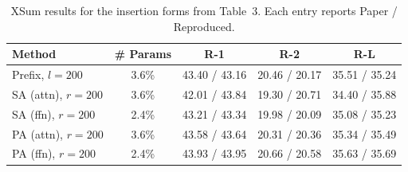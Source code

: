 \begin{table}[t]
\centering
\small
\setlength{\tabcolsep}{3.5pt}
\caption{XSum results for the insertion forms from Table~3. Each entry reports Paper / Reproduced.}
\label{tab:table3_xsum}
\begin{tabular}{@{}lcccc@{}}
\toprule
Method & \# Params & R-1 & R-2 & R-L \\
\midrule
Prefix, $l=200$ & 3.6\% & 43.40 / 43.16 & 20.46 / 20.17 & 35.51 / 35.24 \\
SA (attn), $r=200$ & 3.6\% & 42.01 / 43.84 & 19.30 / 20.71 & 34.40 / 35.88 \\
SA (ffn), $r=200$ & 2.4\% & 43.21 / 43.34 & 19.98 / 20.09 & 35.08 / 35.23 \\
PA (attn), $r=200$ & 3.6\% & 43.58 / 43.64 & 20.31 / 20.36 & 35.34 / 35.49 \\
PA (ffn), $r=200$ & 2.4\% & 43.93 / 43.95 & 20.66 / 20.58 & 35.63 / 35.69 \\
\bottomrule
\end{tabular}
\end{table}

